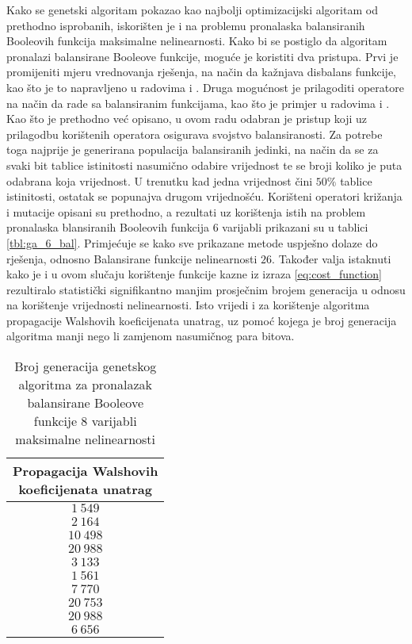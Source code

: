 Kako se genetski algoritam pokazao kao najbolji optimizacijski algoritam od prethodno isprobanih, iskorišten je i na problemu pronalaska balansiranih Booleovih funkcija maksimalne nelinearnosti. 
Kako bi se postiglo da algoritam pronalazi balansirane Booleove funkcije, moguće je koristiti dva pristupa.
Prvi je promijeniti mjeru vrednovanja rješenja, na način da kažnjava disbalans funkcije, kao što je to napravljeno u radovima \cite{MaximalNonlinearity} i \cite{CryptographicBoolean}.
Druga mogućnost je prilagoditi operatore na način da rade sa balansiranim funkcijama, kao što je primjer u radovima \cite{millan1997effective} i \cite{manzoni2019balanced}.
Kao što je prethodno već opisano, u ovom radu odabran je pristup koji uz prilagodbu korištenih operatora osigurava svojstvo balansiranosti.
Za potrebe toga najprije je generirana populacija balansiranih jedinki, na način da se za svaki bit tablice istinitosti nasumično odabire vrijednost te se broji koliko je puta odabrana koja vrijednost.
U trenutku kad jedna vrijednost čini $50\%$ tablice istinitosti, ostatak se popunajva drugom vrijednošću.
Korišteni operatori križanja i mutacije opisani su prethodno, a rezultati uz korištenja istih na problem pronalaska blansiranih Booleovih funkcija $6$ varijabli prikazani su u tablici \ref{tbl:ga_6_bal}.
Primjećuje se kako sve prikazane metode uspješno dolaze do rješenja, odnosno Balansirane funkcije nelinearnosti $26$.
Također valja istaknuti kako je i u ovom slučaju korištenje funkcije kazne iz izraza \eqref{eq:cost_function} rezultiralo statistički signifikantno manjim prosječnim brojem generacija u odnosu na korištenje vrijednosti nelinearnosti.
Isto vrijedi i za korištenje algoritma propagacije Walshovih koeficijenata unatrag, uz pomoć kojega je broj generacija algoritma manji nego li zamjenom nasumičnog para bitova.

\begin{table}[]
    \centering
    \begin{tabular}{c}
        \makecell{Propagacija Walshovih \\ koeficijenata unatrag} \\ \hline
         $1\:549$ \\
         $2\:164$ \\
        $10\:498$ \\
        $20\:988$ \\
         $3\:133$ \\
         $1\:561$ \\
         $7\:770$ \\
        $20\:753$ \\
        $20\:988$ \\
         $6\:656$ 
    \end{tabular}
    \captionsetup{justification=centering}
    \caption{Broj generacija genetskog algoritma za pronalazak balansirane Booleove funkcije $8$ varijabli maksimalne nelinearnosti}
    \label{tbl:ga_8_bal}
\end{table}

